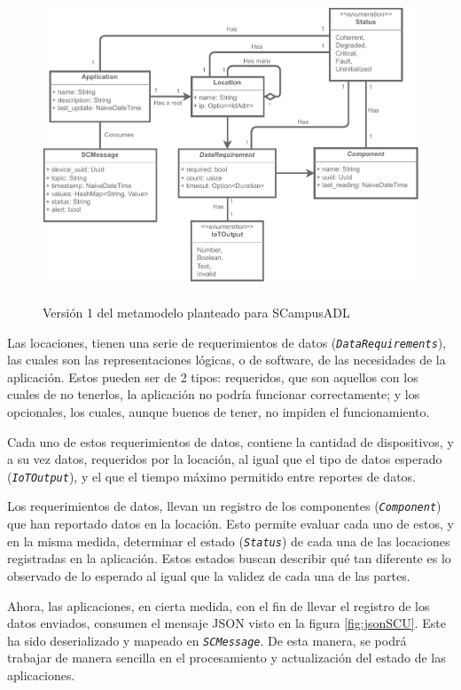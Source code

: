 \begin{figure}[ht]
    \caption{\\Versión 1 del metamodelo planteado para SCampusADL}
    \label{fig:metamodelo}
    \vspace{2mm}
    \includegraphics[width=\linewidth]{images/Metamodel B.pdf}
\end{figure}

Las locaciones, tienen una serie de requerimientos de datos (\texttt{\textit{DataRequirements}}), las cuales son las representaciones lógicas, o de software, de las necesidades de la aplicación. Estos pueden ser de 2 tipos: requeridos, que son aquellos con los cuales de no tenerlos, la aplicación no podría funcionar correctamente; y los opcionales, los cuales, aunque buenos de tener, no impiden el funcionamiento.

Cada uno de estos requerimientos de datos, contiene la cantidad de dispositivos, y a su vez datos, requeridos por la locación, al igual que el tipo de datos esperado (\textit{\texttt{IoTOutput}}), y el que el tiempo máximo permitido entre reportes de datos. 

Los requerimientos de datos, llevan un registro de los componentes (\textit{\texttt{Component}}) que han reportado datos en la locación. Esto permite evaluar cada uno de estos, y en la misma medida, determinar el estado (\textit{\texttt{Status}}) de cada una de las locaciones registradas en la aplicación. Estos estados buscan describir qué tan diferente es lo observado de lo esperado al igual que la validez de cada una de las partes. 

Ahora, las aplicaciones, en cierta medida, con el fin de llevar el registro de los datos enviados, consumen el mensaje JSON visto en la figura \ref{fig:jsonSCU}. Este ha sido deserializado y mapeado en \textit{\texttt{SCMessage}}. De esta manera, se podrá trabajar de manera sencilla en el procesamiento y actualización del estado de las aplicaciones.

